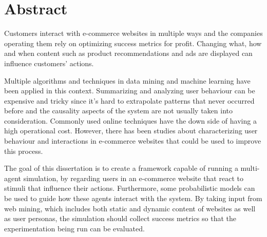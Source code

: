 \chapter*{Abstract}


Customers interact with e-commerce websites in multiple ways and the
companies operating them rely on optimizing success metrics for profit. 
Changing what, how and when content such as product recommendations and ads are 
displayed can influence customers' actions.

Multiple algorithms and techniques in data mining and machine learning
have been applied in this context. Summarizing and analyzing user
behaviour can be expensive and tricky since it's hard to extrapolate
patterns that never occurred before and the causality aspects of the
system are not usually taken into consideration. Commonly used online
techniques have the down side of having a high operational cost. However, there 
has been studies about characterizing user behaviour and interactions in 
e-commerce websites that could be used to improve this process.

The goal of this dissertation is to create a framework capable of running
a multi-agent simulation, by regarding users in an e-commerce website that
react to stimuli that influence their actions. Furthermore, some probabilistic 
models can be used to guide how these agents interact with the system. By 
taking input from web mining, which includes both static and dynamic content of 
websites as well as user personas, the simulation should collect success 
metrics so that the experimentation being run can be evaluated.


